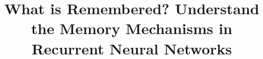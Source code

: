 \documentclass{egpubl}
\title{What is Remembered? Understand the Memory Mechanisms in Recurrent Neural Networks}
\begin{document}
\maketitle

\begin{abstract}
\end{abstract}





\end{document}
